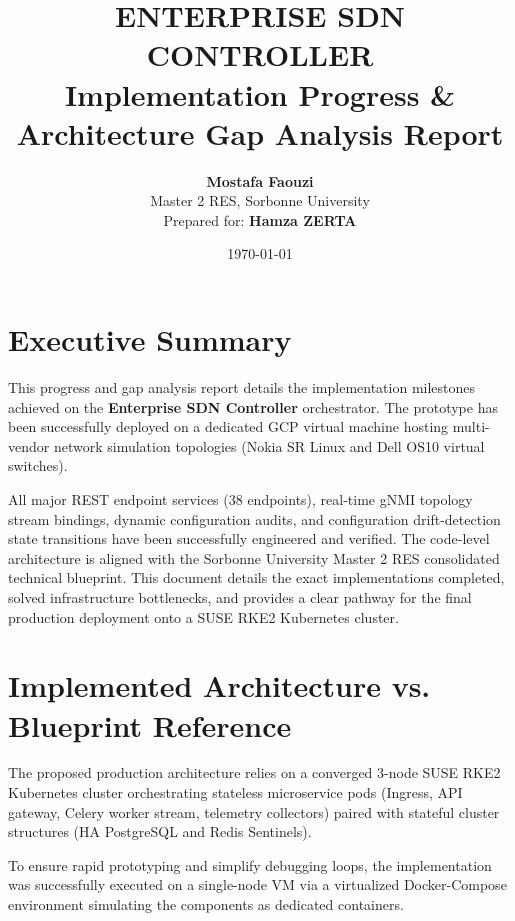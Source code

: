 \documentclass[11pt,a4paper]{article}
\title{\textbf{\Huge ENTERPRISE SDN CONTROLLER}\\
\vspace{0.3cm}
\large Implementation Progress \& Architecture Gap Analysis Report}
\author{\textbf{Mostafa Faouzi} \\
Master 2 RES, Sorbonne University \\
\vspace{0.2cm}
Prepared for: \textbf{Hamza ZERTA}}
\date{\today}
\begin{document}
\maketitle
\tableofcontents
\newpage

\section{Executive Summary}
This progress and gap analysis report details the implementation milestones achieved on the \textbf{Enterprise SDN Controller} orchestrator. The prototype has been successfully deployed on a dedicated GCP virtual machine hosting multi-vendor network simulation topologies (Nokia SR Linux and Dell OS10 virtual switches). 

All major REST endpoint services (38 endpoints), real-time gNMI topology stream bindings, dynamic configuration audits, and configuration drift-detection state transitions have been successfully engineered and verified. The code-level architecture is aligned with the Sorbonne University Master 2 RES consolidated technical blueprint. This document details the exact implementations completed, solved infrastructure bottlenecks, and provides a clear pathway for the final production deployment onto a SUSE RKE2 Kubernetes cluster.

\section{Implemented Architecture vs. Blueprint Reference}
The proposed production architecture relies on a converged 3-node SUSE RKE2 Kubernetes cluster orchestrating stateless microservice pods (Ingress, API gateway, Celery worker stream, telemetry collectors) paired with stateful cluster structures (HA PostgreSQL and Redis Sentinels). 

To ensure rapid prototyping and simplify debugging loops, the implementation was successfully executed on a single-node VM via a virtualized Docker-Compose environment simulating the components as dedicated containers.
\end{document}
